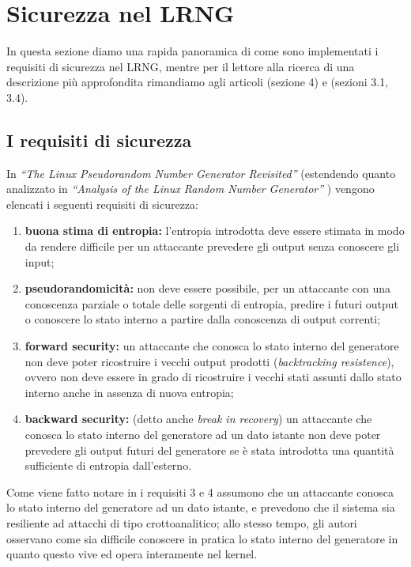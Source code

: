 \documentclass{article}
\begin{document}
  

 \section{Sicurezza nel LRNG}\label{sicurezza}
 In questa sezione diamo una rapida panoramica di come sono implementati
 i requisiti di sicurezza nel LRNG, mentre per il lettore alla ricerca di una
 descrizione più approfondita rimandiamo agli articoli \cite{lach} (sezione 4) e
 \cite{gutt} (sezioni 3.1, 3.4).
 
 \subsection{I requisiti di sicurezza}\label{requisitiSicurezza}
 In \emph{``The Linux Pseudorandom Number Generator Revisited''}
 \cite{lach} (estendendo quanto analizzato in \emph{``Analysis of the Linux
 Random Number Generator''} \cite{gutt}) vengono elencati i seguenti requisiti
 di sicurezza:
 \begin{enumerate}
   \item \textbf{buona stima di entropia:} l'entropia introdotta deve essere
   stimata in modo da rendere difficile per un attaccante prevedere gli output senza
   conoscere gli input;
   \item \textbf{pseudorandomicità:} non deve essere possibile, per un
   attaccante con una conoscenza parziale o totale delle sorgenti di entropia,
   predire i futuri output o conoscere lo stato interno a partire dalla
   conoscenza di output correnti;
   \item \textbf{forward security:} un attaccante che conosca lo stato interno
   del generatore non deve poter ricostruire i vecchi output prodotti
   (\emph{backtracking resistence}), ovvero non deve essere in grado di
   ricostruire i vecchi stati assunti dallo stato interno anche in assenza di
   nuova entropia;
   \item \textbf{backward security:} (detto anche \emph{break in recovery}) un
   attaccante che conosca lo stato interno del generatore ad un dato istante non deve poter prevedere gli output futuri
   del generatore se è stata introdotta una quantità sufficiente di entropia
   dall'esterno.
 \end{enumerate}
 Come viene fatto notare in \cite{lach} i requisiti 3 e 4 assumono che un
 attaccante conosca lo stato interno del generatore ad un dato istante, e
 prevedono che il sistema sia resiliente ad attacchi di tipo crottoanalitico;
 allo stesso tempo, gli autori osservano come sia difficile conoscere in
 pratica lo stato interno del generatore in quanto questo vive ed opera
 interamente nel kernel. 
 
\end{document}
